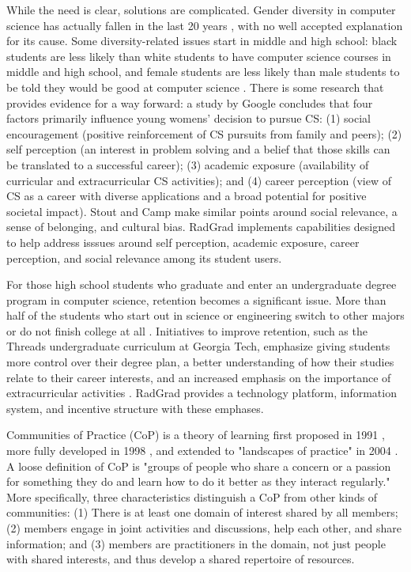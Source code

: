 \documentclass[acmsmall,nonacm]{acmart}
\begin{document}
While the need is clear, solutions are complicated. Gender diversity in computer science has actually fallen in the last 20 years \cite{hong_women_2014}, with no well accepted explanation for its cause. Some diversity-related issues start in middle and high school: black students are less likely than white students to have computer science courses in middle and high school, and female students are less likely than male students to be told they would be good at computer science \cite{inc_diversity_2016}.   There is some research that provides evidence for a way forward: a study by Google \cite{hong_women_2014} concludes that four factors primarily influence young womens' decision to pursue CS: (1) social encouragement (positive reinforcement of CS pursuits from family and peers); (2) self perception (an interest in problem solving and a belief that those skills can be translated to a successful career); (3) academic exposure (availability of curricular and extracurricular CS activities); and (4) career perception (view of CS as a career with diverse applications and a broad potential for positive societal impact). Stout and Camp \cite{stout_now_2014} make similar points around social relevance, a sense of belonging, and cultural bias. RadGrad implements capabilities designed to help address isssues around self perception, academic exposure, career perception, and social relevance among its student users.

For those high school students who graduate and enter an undergraduate degree program in computer science, retention becomes a significant issue.   More than half of the students who start out in science or engineering switch to other majors or do not finish college at all \cite{kober_reaching_2015}. Initiatives to improve retention, such as the Threads undergraduate curriculum at Georgia Tech, emphasize giving students more control over their degree plan, a better understanding of how their studies relate to their career interests, and an increased emphasis on the importance of extracurricular activities \cite{barrett_expanding_2017}. RadGrad provides a technology platform, information system, and incentive structure with these emphases.

Communities of Practice (CoP) is a theory of learning first proposed in 1991 \cite{lave_situated_1991}, more fully developed in 1998 \cite{wenger_communities_1998}, and extended to "landscapes of practice" in 2004 \cite{wenger_learning_2004}. A loose definition of CoP is "groups of people who share a concern or a passion for something they do and learn how to do it better as they interact regularly." More specifically, three characteristics distinguish a CoP from other kinds of communities: (1) There is at least one domain of interest shared by all members; (2) members engage in joint activities and discussions, help each other, and share information;  and (3) members are practitioners in the domain, not just people with shared interests, and thus develop a shared repertoire of resources.
\end{document}
